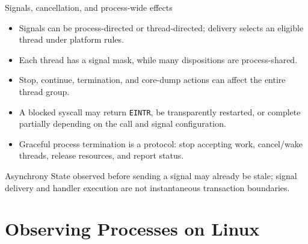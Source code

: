 \documentclass[aspectratio=169,11pt]{beamer}
\newcommand{\code}[1]{\texttt{#1}}
\begin{document}
\begin{frame}{Signals, cancellation, and process-wide effects}
  \begin{itemize}
    \item Signals can be process-directed or thread-directed; delivery selects an eligible thread under platform rules.
    \item Each thread has a signal mask, while many dispositions are process-shared.
    \item Stop, continue, termination, and core-dump actions can affect the entire thread group.
    \item A blocked syscall may return \code{EINTR}, be transparently restarted, or complete partially depending on the call and signal configuration.
    \item Graceful process termination is a protocol: stop accepting work, cancel/wake threads, release resources, and report status.
  \end{itemize}
  \begin{alertblock}{Asynchrony}
    State observed before sending a signal may already be stale; signal delivery and handler execution are not instantaneous transaction boundaries.
  \end{alertblock}
\end{frame}

\section{Observing Processes on Linux}
\end{document}
